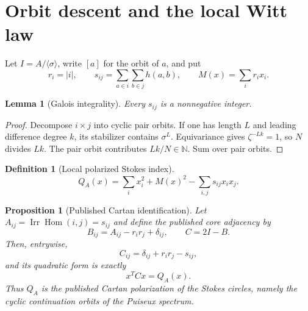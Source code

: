 \documentclass[11pt,a4paper]{amsart}
\theoremstyle{plain}
\newtheorem{proposition}[theorem]{Proposition}
\newtheorem{lemma}[theorem]{Lemma}
\theoremstyle{definition}
\newtheorem{definition}[theorem]{Definition}
\newcommand{\NN}{\mathbb N}
\newcommand{\Irr}{\operatorname{Irr}}
\newcommand{\Hom}{\operatorname{Hom}}
\begin{document}
\section{Orbit descent and the local Witt law}\label{sec:orbit}

Let $I=A/\langle\sigma\rangle$, write $[a]$ for the orbit of $a$, and put
\begin{equation}\label{eq:orbit-data}
 r_i=|i|,\qquad
 s_{ij}=\sum_{a\in i}\sum_{b\in j}h(a,b),\qquad
 M(x)=\sum_ir_ix_i.
\end{equation}

\begin{lemma}[Galois integrality]\label{lem:integrality}
Every $s_{ij}$ is a nonnegative integer.
\end{lemma}

\begin{proof}
Decompose $i\times j$ into cyclic pair orbits.  If one has length $L$ and leading difference
degree $k$, its stabilizer contains $\sigma^L$.  Equivariance gives $\zeta^{-Lk}=1$, so $N$ divides
$Lk$.  The pair orbit contributes $Lk/N\in\NN$.  Sum over pair orbits.
\end{proof}

\begin{definition}[Local polarized Stokes index]\label{def:local-index}
\begin{equation}\label{eq:local-index}
             Q_A(x)=\sum_i x_i^2+M(x)^2-\sum_{i,j}s_{ij}x_ix_j.
\end{equation}
\end{definition}

\begin{proposition}[Published Cartan identification]\label{prop:published-Cartan}
Let $A_{ij}=\Irr\Hom(i,j)=s_{ij}$ and define the published core adjacency by
\begin{equation}\label{eq:core-adjacency}
                 B_{ij}=A_{ij}-r_ir_j+\delta_{ij},\qquad C=2I-B.
\end{equation}
Then, entrywise,
\begin{equation}\label{eq:core-Cartan-entry}
                    C_{ij}=\delta_{ij}+r_ir_j-s_{ij},
\end{equation}
and its quadratic form is exactly
\begin{equation}\label{eq:published-Cartan-identification}
                              x^TCx=Q_A(x).
\end{equation}
Thus $Q_A$ is the published Cartan polarization of the Stokes circles, namely the cyclic
continuation orbits of the Puiseux spectrum.
\end{proposition}
\end{document}
